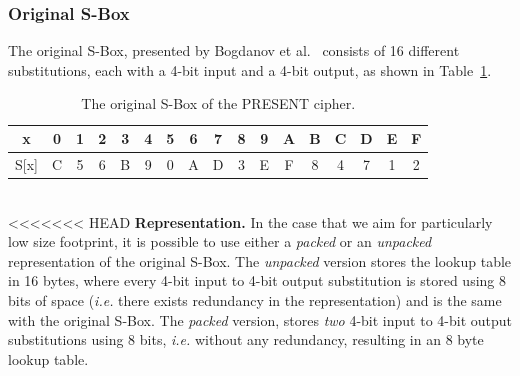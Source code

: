 \documentclass[11pt]{article}
\begin{document}
\subsubsection{Original S-Box}\label{osbox}
The original S-Box, presented by Bogdanov et al.~\cite{bogdanov2007present} consists of 16 different substitutions, each with a 4-bit input and a 4-bit output, as shown in Table~\ref{original_sbox}.
\begin{table}[h]
\footnotesize
\centering
\begin{tabular}{| c | c  | c | c | c  | c | c | c  | c | c | c  | c | c | c  | c | c | c |}
\hline
  x & 0 & 1 & 2 & 3 & 4 & 5 & 6 & 7 & 8 & 9 & A & B & C & D & E & F   \\
\hline
  S[x] & C & 5 & 6 & B & 9 & 0 & A & D & 3 & E & F & 8 & 4 & 7 & 1 & 2   \\
\hline
\end{tabular}
 \caption{\footnotesize The original S-Box of the PRESENT cipher.}
 \label{original_sbox}
\end{table}\\
<<<<<<< HEAD
\textbf{Representation.} In the case that we aim for particularly low size footprint, it is possible to use either a \emph{packed} or an \emph{unpacked} representation of the original S-Box. The \emph{unpacked} version stores the lookup table in 16 bytes, where every 4-bit input to 4-bit output substitution is stored using 8 bits of space (\emph{i.e.} there exists redundancy in the representation) and is the same with the original S-Box. The \emph{packed} version, stores \emph{two} 4-bit input to 4-bit output substitutions using 8 bits, \emph{i.e.} without any redundancy, resulting in an 8 byte lookup table. \\
\end{document}
